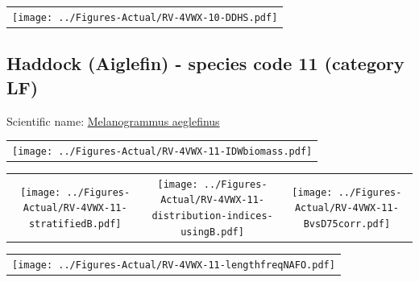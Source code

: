 \documentclass[12pt]{article}\usepackage[]{graphicx}\usepackage[]{color}
\begin{document}
\vspace{1cm}
\begin{minipage}{1.0\textwidth}
 \begin{tabular}{c}
\texttt{[image: ../Figures-Actual/RV-4VWX-10-DDHS.pdf]} \\ 
\end{tabular} 
\end{minipage}
\clearpage

\renewcommand\thefigure{\thesubsection\Alph{figure}}

\setcounter{figure}{0}

\hypertarget{sec:11}{%
\subsection{Haddock (Aiglefin) - species code 11 (category LF)}\label{sec:11}}

  


Scientific name: \href{http://www.marinespecies.org/aphia.php?p=taxdetails\&id=126437}{Melanogrammus aeglefinus} \newline
\begin{minipage}{1.0\textwidth}
 \begin{tabular}{c}
\texttt{[image: ../Figures-Actual/RV-4VWX-11-IDWbiomass.pdf]} \\ 
\end{tabular} 
\end{minipage}
\newline

\vspace{1cm}
\begin{minipage}{1.0\textwidth}
 \begin{tabular}{ccc}
\texttt{[image: ../Figures-Actual/RV-4VWX-11-stratifiedB.pdf]} & 
\texttt{[image: ../Figures-Actual/RV-4VWX-11-distribution-indices-usingB.pdf]} & 
\texttt{[image: ../Figures-Actual/RV-4VWX-11-BvsD75corr.pdf]} \\ 
\end{tabular} 
\end{minipage}
\clearpage
\begin{minipage}{1.0\textwidth}
 \begin{tabular}{c}
\texttt{[image: ../Figures-Actual/RV-4VWX-11-lengthfreqNAFO.pdf]} \\ 
\end{tabular} 
\end{minipage}
\newline
\end{document}
